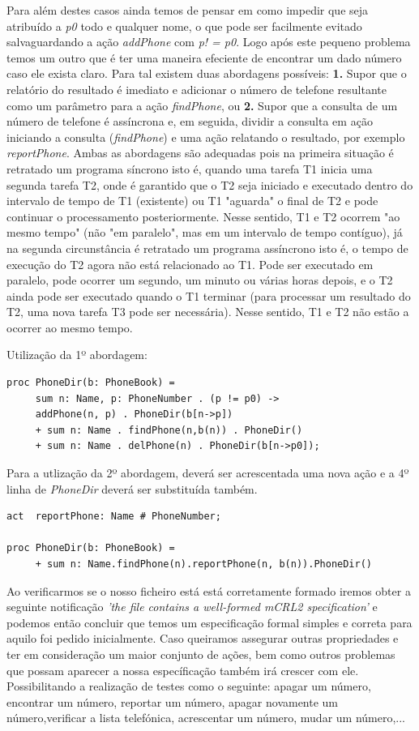 \documentclass[11pt,a4paper]{report}
\begin{document}
Para além destes casos ainda temos de pensar em como impedir que seja atribuído a \emph{p0} todo e qualquer nome, o que pode ser facilmente evitado salvaguardando a ação \emph{addPhone} com \emph{p! = p0}. Logo após este pequeno problema temos um outro que é ter uma maneira efeciente de encontrar um dado número caso ele exista claro. Para tal existem duas abordagens possíveis:  \textbf{1.} Supor que o relatório do resultado é imediato e adicionar o número de telefone resultante como um parâmetro para a ação \emph{findPhone}, ou  \textbf{2.} Supor que a consulta de um número de telefone é assíncrona e, em seguida, dividir a consulta em ação iniciando a consulta (\emph{findPhone}) e uma ação relatando o resultado, por exemplo  \emph{reportPhone}.
Ambas as abordagens são adequadas pois na primeira situação é retratado um programa síncrono isto é, quando uma tarefa T1 inicia uma segunda tarefa T2, onde é garantido que o T2 seja iniciado e executado dentro do intervalo de tempo de T1 (existente) ou T1 "aguarda" o final de T2 e pode continuar o processamento posteriormente. Nesse sentido, T1 e T2 ocorrem "ao mesmo tempo" (não "em paralelo", mas em um intervalo de tempo contíguo), já na segunda circunstância é retratado um programa assíncrono isto é, o tempo de execução do T2 agora não está relacionado ao T1. Pode ser executado em paralelo, pode ocorrer um segundo, um minuto ou várias horas depois, e o T2 ainda pode ser executado quando o T1 terminar (para processar um resultado do T2, uma nova tarefa T3 pode ser necessária). Nesse sentido, T1 e T2 não estão a ocorrer ao mesmo tempo.

Utilização da 1º abordagem:

\begin{lstlisting}
proc PhoneDir(b: PhoneBook) = 
     sum n: Name, p: PhoneNumber . (p != p0) -> 
     addPhone(n, p) . PhoneDir(b[n->p])
     + sum n: Name . findPhone(n,b(n)) . PhoneDir()
     + sum n: Name . delPhone(n) . PhoneDir(b[n->p0]);
\end{lstlisting}

Para a utlização da 2º abordagem, deverá ser acrescentada uma nova ação e a 4º linha de \emph{PhoneDir} deverá ser substituída também.
\begin{lstlisting}
act  reportPhone: Name # PhoneNumber;

proc PhoneDir(b: PhoneBook) = 
     + sum n: Name.findPhone(n).reportPhone(n, b(n)).PhoneDir()
\end{lstlisting}

Ao verificarmos se o nosso ficheiro está está corretamente formado iremos obter a seguinte notificação \emph{'the file contains a well-formed mCRL2 specification'} e podemos então concluir que temos um especificação formal simples e correta para aquilo foi pedido inicialmente. Caso queiramos assegurar outras propriedades e ter em consideração um maior conjunto de ações, bem como outros problemas que possam aparecer a nossa específicação também irá crescer com ele. Possibilitando a realização de testes como o seguinte: apagar um número, encontrar um número, reportar um número, apagar novamente um número,verificar a lista telefónica, acrescentar um número, mudar um número,...
\end{document}
